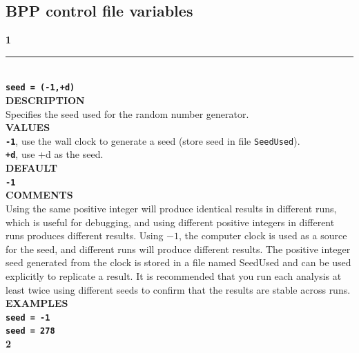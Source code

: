 \documentclass[a4paper]{book}
\numberwithin{equation}{section} \renewcommand{\baselinestretch}{0.55}
\begin{document}
\subsection{BPP control file variables} \label{controlfilevariables}
\textbf{{\large 1}} \\
\noindent\rule{\textwidth}{0.8pt} \\
\textbf{{\Large \texttt{seed = (-1,+d)}}} \vspace{5pt}\\
\textbf{DESCRIPTION} \vspace{5pt}\\
Specifies the seed used for the random number generator.\vspace{5pt}\\
\textbf{VALUES} \vspace{5pt}\\
\textbf{\texttt{-1}}, use the wall clock to generate a seed (store seed in file \texttt{SeedUsed}).\vspace{5pt}\\
\textbf{\texttt{+d}}, use +d as the seed.\vspace{10pt}\\
\textbf{DEFAULT} \vspace{5pt}\\
\textbf{\texttt{-1}} \vspace{5pt}\\
\textbf{COMMENTS} \vspace{5pt}\\
Using the same positive integer will produce identical results in
different runs, which is useful for debugging, and using different
positive integers in different runs produces different results.  Using
$-1$, the computer clock is used as a source for the seed, and
different runs will produce different results. The positive integer
seed generated from the clock is stored in a file named SeedUsed and
can be used explicitly to replicate a result. It is recommended that
you run each analysis at least
twice using different seeds to confirm that the results are stable across runs. \vspace{5pt}\\
\textbf{EXAMPLES} \vspace{5pt}\\
\textbf{\texttt{seed = -1}}\vspace{5pt}\\
\textbf{\texttt{seed = 278}}\vspace{10pt}\\
\textbf{{\large 2}} \\
\end{document}
